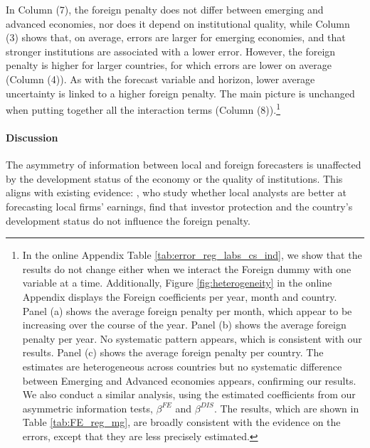 In Column (7), the foreign penalty does not differ between emerging and advanced economies, nor does it depend on institutional quality, while Column (3) shows that, on average, errors are larger for emerging economies, and that stronger institutions are associated with a lower error. However, the foreign penalty is higher for larger countries, for which errors are lower on average (Column (4)). As with the forecast variable and horizon, lower average uncertainty is linked to a higher foreign penalty. The main picture is unchanged when putting together all the interaction terms (Column (8)).\footnote{In the online Appendix Table \ref{tab:error_reg_labs_cs_ind}, we show that the results do not change either when we interact the Foreign dummy with one variable at a time. Additionally, Figure \ref{fig:heterogeneity} in the online Appendix displays the Foreign coefficients per year, month and country. Panel (a) shows the average foreign penalty per month, which appear to be increasing over the course of the year. Panel (b) shows the average foreign penalty per year. No systematic pattern appears, which is consistent with our results. Panel (c) shows the average foreign penalty per country. The estimates are heterogeneous across countries but no systematic difference between Emerging and Advanced economies appears, confirming our results. We also conduct a similar analysis, using the estimated coefficients from our asymmetric information tests, $\beta^{FE}$ and $\beta^{DIS}$. The results, which are shown in Table \ref{tab:FE_reg_mg}, are broadly consistent with the evidence on the errors, except that they are less precisely estimated.}


{
	
}

\paragraph{Discussion}


The asymmetry of information between local and foreign forecasters is unaffected by the development status of the economy or the quality of institutions. This aligns with existing evidence: \citet{Baeetal2008}, who study whether local analysts are better at forecasting local firms' earnings, find that investor protection and the country's development status do not influence the foreign penalty.

